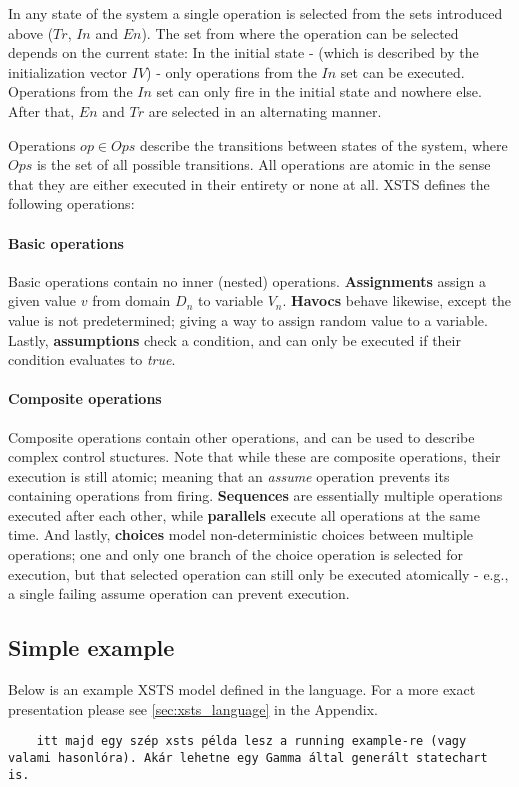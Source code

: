 In any state of the system a single operation is selected from the sets introduced above (\(Tr\), \(In\) and \(En\)). The set from where the operation can be selected depends on the current state: In the initial state - (which is described by the initialization vector \(IV\)) - only operations from the \(In\) set can be executed. Operations from the \(In\) set can only fire in the initial state and nowhere else. After that, \(En\) and \(Tr\) are selected in an alternating manner.

Operations \(op \in Ops\) describe the transitions between states of the system, where \(Ops\) is the set of all possible transitions. All operations are atomic in the sense that they are either executed in their entirety or none at all. XSTS defines the following operations:

\paragraph{Basic operations}

Basic operations contain no inner (nested) operations. \textbf{Assignments} assign a given value \(v\) from domain \(D_n\) to variable \(V_n\). \textbf{Havocs} behave likewise, except the value is not predetermined; giving a way to assign random value to a variable. Lastly, \textbf{assumptions} check a condition, and can only be executed if their condition evaluates to \emph{true}.

\paragraph{Composite operations}

Composite operations contain other operations, and can be used to describe complex control stuctures. Note that while these are composite operations, their execution is still atomic; meaning that an \emph{assume} operation prevents its containing operations from firing. \textbf{Sequences} are essentially multiple operations executed after each other, while \textbf{parallels} execute all operations at the same time. And lastly, \textbf{choices} model non-deterministic choices between multiple operations; one and only one branch of the choice operation is selected for execution, but that selected operation can still only be executed atomically - e.g., a single failing assume operation can prevent execution.

\subsection{Simple example}

Below is an example XSTS model defined in the language. For a more exact presentation please see \autoref{sec:xsts_language} in the Appendix.

\begin{Verbatim}
	itt majd egy szép xsts példa lesz a running example-re (vagy valami hasonlóra). Akár lehetne egy Gamma által generált statechart is.
\end{Verbatim}

